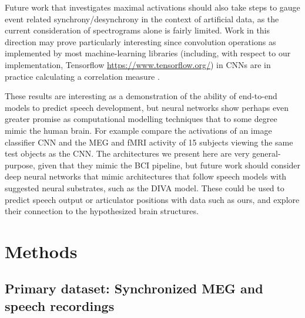 \documentclass[fleqn,10pt]{wlscirep}
\begin{document}
Future work that investigates maximal activations should also take steps to gauge event related synchrony/desynchrony in the context of artificial data, as the current consideration of spectrograms alone is fairly limited. Work in this direction may prove particularly interesting since convolution operations as implemented by most machine-learning libraries (including, with respect to our implementation, Tensorflow \url{https://www.tensorflow.org/}) in CNNs are in practice calculating a correlation measure \cite{GravesRNNBook}.

These results are interesting as a demonstration of the ability of end-to-end models to predict speech development, but neural networks show perhaps even greater promise as computational modelling techniques that to some degree mimic the human brain. For example \cite{cichy2016} compare the activations of an image classifier CNN and the MEG and fMRI activity of 15 subjects viewing the same test objects as the CNN. The architectures we present here are very general-purpose, given that they mimic the BCI pipeline, but future work should consider deep neural networks that mimic architectures that follow speech models with suggested neural substrates, such as the DIVA model\cite{Guenther2005}. These could be used to predict speech output or articulator positions with data such as ours, and explore their connection to the hypothesized brain structures.

\section*{Methods}

\subsection*{Primary dataset: Synchronized MEG and speech recordings}
\end{document}
